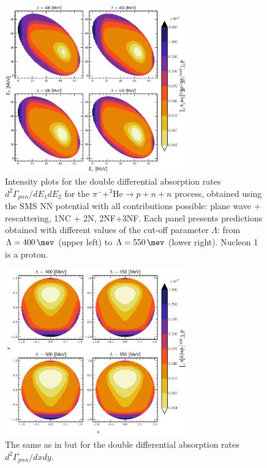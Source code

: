         \begin{figure}[h]
            \begin{center}
            \includegraphics[width=0.7\textwidth]{PlotData/PION/Dalitz_maps/figures/Dalitz_map_pnn_E1E2_cutofs.pdf}
            \end{center}
            \caption{Intensity plots for the double differential absorption rates
            $d^2 \Gamma_{pnn}/dE_1dE_2$ for the $\pi^- + ^3\text{He} \rightarrow p + n + n$ process, obtained using the SMS NN potential
            with all contributions possible: plane wave + rescattering, 1NC + 2N, 2NF+3NF.
            Each panel presents predictions obtained with different values of the cut-off parameter $\Lambda$:
            from $\Lambda=\SI{400}{\mev}$ (upper left) to $\Lambda=\SI{550}{\mev}$ (lower right). Nucleon 1 is a proton.}
            \label{pion_map_E1E2_cutoff}
        \end{figure}

    \begin{figure}[h]
        \begin{center}
        \includegraphics[width=0.7\textwidth]{PlotData/PION/Dalitz_maps/figures/Dalitz_map_pnn_xy_cutofs.pdf}
        \end{center}
        \caption{The same as in  but for the double differential absorption rates
        $d^2 \Gamma_{pnn}/dxdy$.}
        \label{pion_map_xy_cutoff}
    \end{figure}

